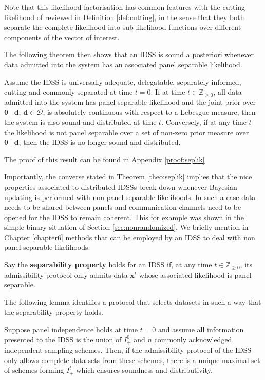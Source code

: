 Note that this likelihood factorisation has common features with the cutting likelihood of \citet{Faria1997} reviewed in Definition \ref{def:cutting}, in the sense that they both separate the complete likelihood into sub-likelihood functions over different components of the vector of interest. 

The following theorem then shows that an IDSS is sound a posteriori whenever  data admitted into the system has an associated panel separable likelihood. 

\begin{theorem}
\label{theo:seplik}
Assume the IDSS is universally adequate, delegatable, separately informed, cutting and commonly separated at time $t=0$. If at time $t\in\mathbb{Z}_{\geq 0}$, all data admitted into the system has panel separable likelihood and the joint prior over $\bm{\theta }\;|\;\bm{d}$, $\bm{d}\in\bm{\mathcal{D}}$, is absolutely continuous with respect to a Lebesgue measure, then the system is also sound and distributed at time $t$. Conversely, if at any time $t$ the likelihood is not panel separable over a set of non-zero prior measure over $\bm{\theta }\;|\;\bm{d}$, then the IDSS is no longer sound and distributed.
\end{theorem}
The proof of this result can be found in Appendix \ref{proof:seplik}

Importantly, the converse stated in Theorem \ref{theo:seplik} implies that the nice properties associated to distributed IDSSs break down whenever Bayesian updating is performed with non panel separable likelihoods. In such a case data needs to be shared between panels and communication channels need to be opened for the IDSS to remain coherent. This for example was shown in the simple binary situation of Section \ref{sec:nonrandomized}. We briefly mention in Chapter \ref{chapter6} methods that can be employed by an IDSS to deal with non panel separable likelihoods.

\begin{definition}
Say the \textbf{separability property} holds for an IDSS if, at any time $t\in\mathbb{Z}_{\geq 0}$,  its admissibility protocol only admits data $\bm{x}^t$ whose associated likelihood is panel separable.
\end{definition}

The following lemma identifies a protocol that selects datasets in such a way that the separability property holds. 
\begin{lemma}
\label{lemma:max}
Suppose panel independence holds at time $t=0$ and assume all information presented to the IDSS is the union of $I_{+}^{0} $ and $n$ commonly acknowledged independent sampling schemes. Then, if the admissibility protocol of the IDSS only allows complete data sets from these schemes, there is a unique maximal set of schemes forming $I_{+}^{t}$ which ensures soundness and distributivity.
\end{lemma}

